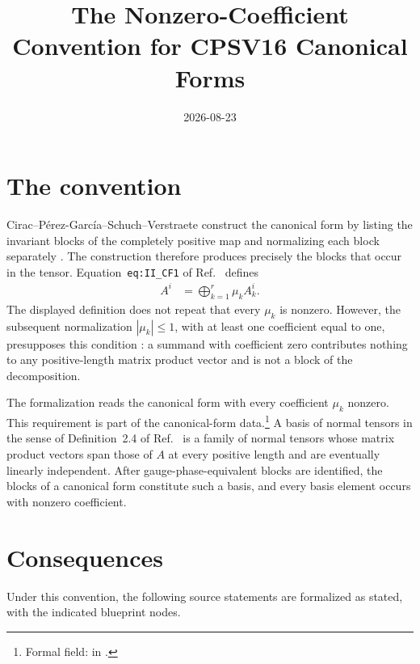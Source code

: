\documentclass{article}
\title{The Nonzero-Coefficient Convention for CPSV16 Canonical Forms}
\author{}
\date{2026-08-23}
\begin{document}
\maketitle
{}

\section{The convention}

Cirac--P\'erez-Garc\'ia--Schuch--Verstraete construct the canonical form by
listing the invariant blocks of the completely positive map and normalizing
each block separately \cite[lines 214--225]{Cirac2016MPDO_arXiv}. The
construction therefore produces precisely the blocks that occur in the
tensor. Equation~\texttt{eq:II\_CF1} of
Ref.~\cite[lines 238--244]{Cirac2016MPDO_arXiv} defines
\begin{align}
    A^i
        &= \bigoplus_{k=1}^r \mu_k A_k^i.
    \label{eq:cpsvbnt_canonical_form_decomposition}
\end{align}
The displayed definition does not repeat that every $\mu_k$ is nonzero.
However, the subsequent normalization $|\mu_k|\leq 1$, with at least one
coefficient equal to one, presupposes this condition
\cite[line 246]{Cirac2016MPDO_arXiv}: a summand with coefficient zero
contributes nothing to any positive-length matrix product vector and is not a
block of the decomposition.

The formalization reads the canonical form with every coefficient $\mu_k$
nonzero. This requirement is part of the canonical-form data.\footnote{Formal
field:  in
.} A basis of normal tensors
in the sense of Definition~2.4 of Ref.~\cite{Cirac2016MPDO_arXiv} is a family
of normal tensors whose matrix product vectors span those of $A$ at every
positive length and are eventually linearly independent. After
gauge-phase-equivalent blocks are identified, the blocks of a canonical form
constitute such a basis, and every basis element occurs with nonzero
coefficient.

\section{Consequences}

Under this convention, the following source statements are formalized as
stated, with the indicated blueprint nodes.
\end{document}
